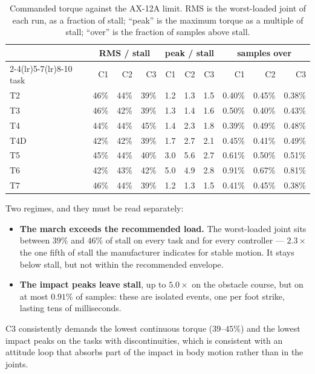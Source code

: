 \documentclass[11pt,a4paper]{article}
\newcommand{\Co}{\textsf{C1}}
\newcommand{\Ct}{\textsf{C2}}
\newcommand{\Cth}{\textsf{C3}}
\begin{document}
\begin{table}[htbp]
\centering
\caption{Commanded torque against the AX-12A limit. RMS is the worst-loaded
joint of each run, as a fraction of stall; ``peak'' is the maximum torque as a
multiple of stall; ``over'' is the fraction of samples above stall.}
\label{tab:feasibility}
\small
\begin{tabular}{@{}lrrrrrrrrr@{}}
\toprule
& \multicolumn{3}{c}{RMS / stall} & \multicolumn{3}{c}{peak / stall}
& \multicolumn{3}{c}{samples over} \\
\cmidrule(lr){2-4}\cmidrule(lr){5-7}\cmidrule(lr){8-10}
task & \Co & \Ct & \Cth & \Co & \Ct & \Cth & \Co & \Ct & \Cth \\
\midrule
T2  & 46\% & 44\% & 39\% & 1.2 & 1.3 & 1.5 & 0.40\% & 0.45\% & 0.38\% \\
T3  & 46\% & 42\% & 39\% & 1.3 & 1.4 & 1.6 & 0.50\% & 0.40\% & 0.43\% \\
T4  & 44\% & 44\% & 45\% & 1.4 & 2.3 & 1.8 & 0.39\% & 0.49\% & 0.48\% \\
T4D & 42\% & 42\% & 39\% & 1.7 & 2.7 & 2.1 & 0.45\% & 0.41\% & 0.49\% \\
T5  & 45\% & 44\% & 40\% & 3.0 & 5.6 & 2.7 & 0.61\% & 0.50\% & 0.51\% \\
T6  & 42\% & 43\% & 42\% & 5.0 & 4.9 & 2.8 & 0.91\% & 0.67\% & 0.81\% \\
T7  & 46\% & 44\% & 39\% & 1.2 & 1.3 & 1.5 & 0.41\% & 0.45\% & 0.38\% \\
\bottomrule
\end{tabular}
\end{table}

Two regimes, and they must be read separately:

\begin{itemize}
\item \textbf{The march exceeds the recommended load.} The worst-loaded joint
sits between $39\%$ and $46\%$ of stall on every task and for every
controller --- $2.3\times$ the one fifth of stall the manufacturer indicates
for stable motion. It stays below stall, but not within the recommended
envelope.
\item \textbf{The impact peaks leave stall}, up to $5.0\times$ on the obstacle
course, but on at most $0.91\%$ of samples: these are isolated events, one per
foot strike, lasting tens of milliseconds.
\end{itemize}

\Cth{} consistently demands the lowest continuous torque ($39$--$45\%$) and the
lowest impact peaks on the tasks with discontinuities, which is consistent with
an attitude loop that absorbs part of the impact in body motion rather than in
the joints.
\end{document}
